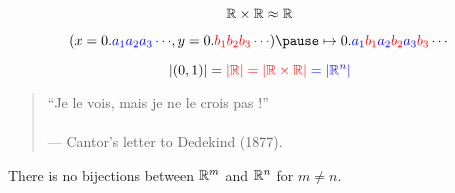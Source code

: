 \begin{frame}{}
  \[
    \mathbb{R} \times \mathbb{R} \approx \mathbb{R}
  \]

  \pause
  \[
    (x = 0.\blue{a_1 a_2 a_3 \cdots}, y = 0.\red{b_1 b_2 b_3 \cdots}) \pause \mapsto 0.\blue{a_1}\red{b_1}\blue{a_2}\red{b_2}\blue{a_3}\red{b_3}\cdots
  \]

  \pause

  \begin{center}
    \href{https://www.maa.org/sites/default/files/pdf/pubs/AMM-March11\_Cantor.pdf}{}
  \end{center}
\end{frame}

\begin{frame}{}
  \begin{theorem}[$|\R|$ (Cantor 1877)]
    \[
      |(0,1)| = \textcolor{red}{|\mathbb{R}| = |\mathbb{R} \times \mathbb{R}|} \textcolor{blue}{\;= |\mathbb{R}^{n}|}
    \]
  \end{theorem}

  \vspace{0.60cm}
  \begin{quote}
    \begin{center}
      ``Je le vois, mais je ne le crois pas !'' \\[4pt]
       \\[5pt]
      \hfill --- Cantor's letter to Dedekind (1877).
    \end{center}
  \end{quote}

  \pause
  \begin{center}
    {}
  \end{center}

  \pause
  \begin{theorem}
    There is no  bijections between $\mathbb{R}^m$ and $\mathbb{R}^n$ for $m \neq n$.
  \end{theorem}
\end{frame}

